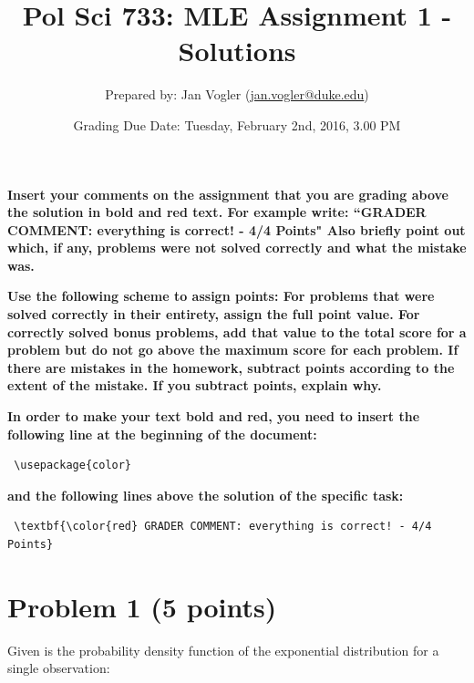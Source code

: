 \documentclass[12pt]{article}\usepackage[]{graphicx}\usepackage[]{color}
\begin{document}
\title{Pol Sci 733: MLE Assignment 1 - Solutions}

\author{Prepared by: Jan Vogler (\href{mailto:jan.vogler@duke.edu}{jan.vogler@duke.edu})}

\date{Grading Due Date: Tuesday, February 2nd, 2016, 3.00 PM}
 
\maketitle



\textbf{\color{red} Insert your comments on the assignment that you are grading above the solution in bold and red text. For example write: ``GRADER COMMENT: everything is correct! - 4/4 Points" Also briefly point out which, if any, problems were not solved correctly and what the mistake was.}

\bigskip

\textbf{Use the following scheme to assign points: For problems that were solved correctly in their entirety, assign the full point value. For correctly solved bonus problems, add that value to the total score for a problem but do not go above the maximum score for each problem. If there are mistakes in the homework, subtract points according to the extent of the mistake. If you subtract points, explain why.}

\bigskip

\textbf{In order to make your text bold and red, you need to insert the following line at the beginning of the document:}

\begin{verbatim} \usepackage{color} \end{verbatim}

\textbf{and the following lines above the solution of the specific task:}

\begin{verbatim} \textbf{\color{red} GRADER COMMENT: everything is correct! - 4/4 Points} \end{verbatim}



\pagebreak

\section*{Problem 1 (5 points)}

Given is the probability density function of the exponential distribution for a single observation:
\end{document}
